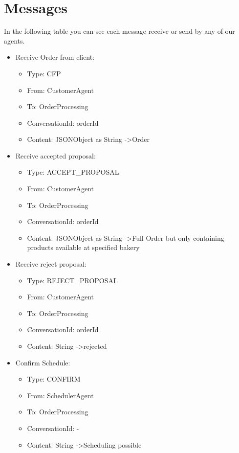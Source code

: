 \documentclass[10pt,a4paper]{article}
\begin{document}
	\newpage
	\FloatBarrier
	\recalctypearea
	\section{Messages}
	In the following table you can see each message receive or send by any of our agents.
	\begin{itemize}
		\item Receive Order from client:
		\begin{itemize}
			\item Type: CFP
			\item From: CustomerAgent
			\item To: OrderProcessing
			\item ConversationId: {orderId}
			\item Content: JSONObject as String -\textgreater Order
		\end{itemize}
		\item Receive accepted proposal:
		\begin{itemize}
			\item Type: ACCEPT\_PROPOSAL
			\item From: CustomerAgent
			\item To: OrderProcessing
			\item ConversationId: {orderId}
			\item Content: JSONObject as String -\textgreater Full Order but only containing products available at specified bakery
		\end{itemize}
		\item Receive reject proposal:
		\begin{itemize}
			\item Type: REJECT\_PROPOSAL
			\item From: CustomerAgent
			\item To: OrderProcessing
			\item ConversationId: {orderId}
			\item Content: String -\textgreater \glqq rejected\grqq
		\end{itemize}
		\item Confirm Schedule:
		\begin{itemize}
			\item Type: CONFIRM
			\item From: SchedulerAgent
			\item To: OrderProcessing
			\item ConversationId: -
			\item Content: String -\textgreater \glqq Scheduling possible\grqq

\end{itemize}
\end{itemize}
\end{document}
